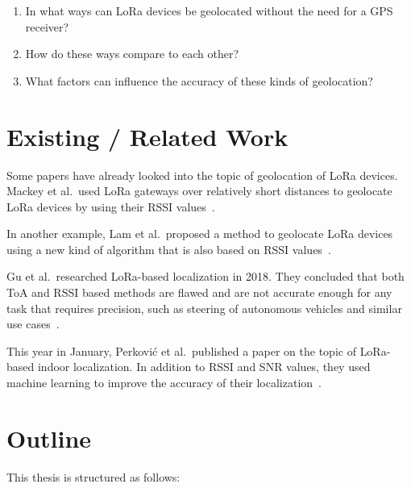 \begin{enumerate}
      \item In what ways can \ac{LoRa} devices be geolocated without the need for a \ac{GPS} receiver?
      \item How do these ways compare to each other?
      \item What factors can influence the accuracy of these kinds of geolocation?
\end{enumerate}

\section{Existing / Related Work}

Some papers have already looked into the topic of geolocation of \ac{LoRa} devices.
Mackey et al.~used \ac{LoRa} gateways over relatively short distances to geolocate \ac{LoRa} devices by using their \ac{RSSI} values~\cite{mackey_lora-based_2019}.

In another example, Lam et al.~proposed a method to geolocate \ac{LoRa} devices using a new kind of algorithm that is also based on \ac{RSSI} values~\cite{lam_new_2018}.

Gu et al.\ researched \ac{LoRa}-based localization in 2018.
They concluded that both \ac{ToA} and \ac{RSSI} based methods are flawed and are not accurate enough for any task that requires precision, such as steering of autonomous vehicles and similar use cases~\cite{gu_lora-based_2018}.

This year in January, Perković et al.\ published a paper on the topic of \ac{LoRa}-based indoor localization.
In addition to \ac{RSSI} and \ac{SNR} values, they used machine learning to improve the accuracy of their localization~\cite{perkovic_machine_2023}.


\section{Outline}

This thesis is structured as follows:

